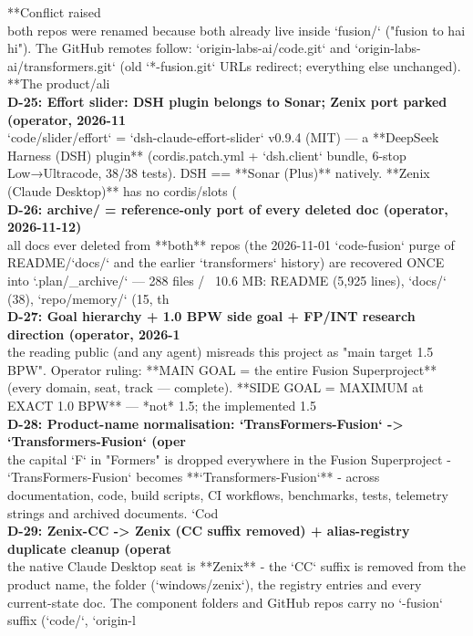 {{**Conflict raised}\\
\noindent both repos were renamed because both already live inside `fusion/` ("fusion to hai hi"). The GitHub remotes follow: `origin-labs-ai/code.git` and `origin-labs-ai/transformers.git` (old `*-fusion.git` URLs redirect; everything else unchanged). **The product/ali\\

\noindent\textbf{D-25: Effort slider: DSH plugin belongs to Sonar; Zenix port parked (operator, 2026-11}\\
\noindent `code/slider/effort` = `dsh-claude-effort-slider` v0.9.4 (MIT) — a **DeepSeek Harness (DSH) plugin** (cordis.patch.yml + `dsh.client` bundle, 6-stop Low→Ultracode, 38/38 tests). DSH == **Sonar (Plus)** natively. **Zenix (Claude Desktop)** has no cordis/slots (\\

\noindent\textbf{D-26:  archive/ = reference-only port of every deleted doc (operator, 2026-11-12)}\\
\noindent all docs ever deleted from **both** repos (the 2026-11-01 `code-fusion` purge of README/`docs/` and the earlier `transformers` history) are recovered ONCE into `.plan/\_archive/` — 288 files / ~10.6 MB: README (5,925 lines), `docs/` (38), `repo/memory/` (15, th\\

\noindent\textbf{D-27: Goal hierarchy + 1.0 BPW side goal + FP/INT research direction (operator, 2026-1}\\
\noindent the reading public (and any agent) misreads this project as "main target 1.5 BPW". Operator ruling: **MAIN GOAL = the entire Fusion Superproject** (every domain, seat, track — complete). **SIDE GOAL = MAXIMUM at EXACT 1.0 BPW** — *not* 1.5; the implemented 1.5\\

\noindent\textbf{D-28: Product-name normalisation: `TransFormers-Fusion` -> `Transformers-Fusion` (oper}\\
\noindent the capital `F` in "Formers" is dropped everywhere in the Fusion Superproject - `TransFormers-Fusion` becomes **`Transformers-Fusion`** - across documentation, code, build scripts, CI workflows, benchmarks, tests, telemetry strings and archived documents. `Cod\\

\noindent\textbf{D-29: Zenix-CC -> Zenix (CC suffix removed) + alias-registry duplicate cleanup (operat}\\
\noindent the native Claude Desktop seat is **Zenix** - the `CC` suffix is removed from the product name, the folder (`windows/zenix`), the registry entries and every current-state doc. The component folders and GitHub repos carry no `-fusion` suffix (`code/`, `origin-l\\

}
